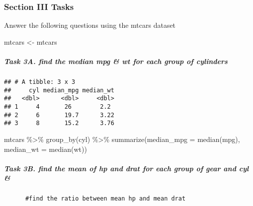 \documentclass[]{article}
\newenvironment{Shaded}{\begin{snugshade}}{\end{snugshade}}
\newcommand{\KeywordTok}[1]{\textcolor[rgb]{0.13,0.29,0.53}{\textbf{#1}}}
\newcommand{\DataTypeTok}[1]{\textcolor[rgb]{0.13,0.29,0.53}{#1}}
\newcommand{\StringTok}[1]{\textcolor[rgb]{0.31,0.60,0.02}{#1}}
\newcommand{\OperatorTok}[1]{\textcolor[rgb]{0.81,0.36,0.00}{\textbf{#1}}}
\newcommand{\NormalTok}[1]{#1}
\let\oldsubparagraph\subparagraph
\renewcommand{\subparagraph}[1]{\oldsubparagraph{#1}\mbox{}}
\begin{document}
\subsubsection{Section III Tasks}\label{section-iii-tasks}

Answer the following questions using the mtcars dataset

\begin{Shaded}
\begin{Highlighting}[]
\NormalTok{mtcars <-}\StringTok{ }\NormalTok{mtcars}
\end{Highlighting}
\end{Shaded}

\subparagraph{Task 3A. find the median mpg \& wt for each group of
cylinders}\label{task-3a.-find-the-median-mpg-wt-for-each-group-of-cylinders}

\begin{Shaded}
\end{Shaded}

\begin{verbatim}
## # A tibble: 3 x 3
##     cyl median_mpg median_wt
##   <dbl>      <dbl>     <dbl>
## 1     4       26        2.2 
## 2     6       19.7      3.22
## 3     8       15.2      3.76
\end{verbatim}

mtcars \%\textgreater{}\% group\_by(cyl) \%\textgreater{}\%
summarize(median\_mpg = median(mpg), median\_wt = median(wt))

\subparagraph{Task 3B. find the mean of hp and drat for each group of
gear and cyl
\&}\label{task-3b.-find-the-mean-of-hp-and-drat-for-each-group-of-gear-and-cyl}

\begin{verbatim}
      #find the ratio between mean hp and mean drat
      
\end{verbatim}

\begin{Shaded}
\end{Shaded}
\end{document}
